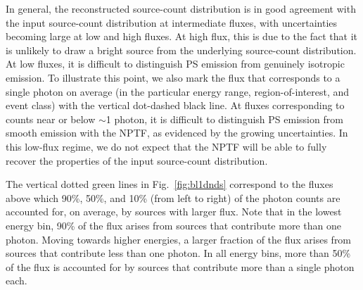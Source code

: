 In general, the reconstructed source-count distribution is in good agreement with the input source-count distribution at intermediate fluxes, with uncertainties becoming large at low and high fluxes.  At high flux, this is due to the fact that it is unlikely to draw a bright source from the underlying source-count distribution.  At low fluxes, it is difficult to distinguish PS emission from genuinely isotropic emission.  To illustrate this point, we also mark the flux that corresponds to a single photon on average (in the particular energy range, region-of-interest, and event class) with the vertical dot-dashed black line.  At fluxes corresponding to counts near or below $\sim$1 photon, it is difficult to distinguish PS emission from smooth emission with the NPTF, as evidenced by the growing uncertainties.  In this low-flux regime, we do not expect that the NPTF will be able to fully recover the properties of the input source-count distribution.  

The vertical dotted green lines in Fig.~\ref{fig:bl1dnds} correspond to the fluxes above which 90\%, 50\%, and 10\% (from left to right) of the photon counts are accounted for, on average, by sources with larger flux.  Note that in the lowest energy bin, 90\% of the flux arises from sources that contribute more than one photon.  Moving towards higher energies, a larger fraction of the flux arises from sources that contribute less than one photon.  In all energy bins, more than 50\% of the flux is accounted for by sources that contribute more than a single photon each.


